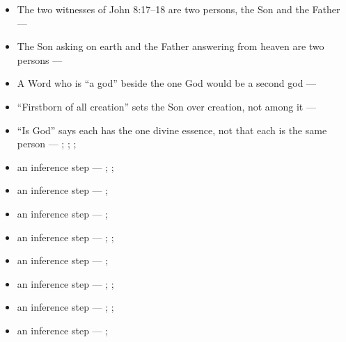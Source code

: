 \documentclass[11pt,paper=\testimonypaper,DIV=13,parskip=false]{scrartcl}
\begin{document}
\begin{itemize}
\begin{itemize}
\item The two witnesses of John 8:17–18 are two persons, the Son and the Father --- \cite[Against Praxeas 22]{roberts-ante-nicene-fathers-3-1885}
\item The Son asking on earth and the Father answering from heaven are two persons --- \cite[Against Praxeas 23]{roberts-ante-nicene-fathers-3-1885}
\item A Word who is “a god” beside the one God would be a second god --- \cite[75]{metzger-jehovahs-witnesses-jesus-christ-1953}
\item “Firstborn of all creation” sets the Son over creation, not among it --- \cite[Against the Arians II.62–63]{schaff-nicene-post-nicene-fathers-2-4-1892}
\item “Is God” says each has the one divine essence, not that each is the same person --- \cite[Letter 214, §4]{schaff-nicene-post-nicene-fathers-2-8-1895}; \cite[Letter 236, §6]{schaff-nicene-post-nicene-fathers-2-8-1895}; \cite[The Creed of Nicaea]{schaff-nicene-post-nicene-fathers-2-14-1900}; \cite[Against Praxeas 25]{roberts-ante-nicene-fathers-3-1885}
\item an inference step --- \cite[3, The Triune God]{kibbey-living-systematic-theology-2026}; \cite[ch. 4, Conclusion]{bernard-oneness-of-god-1983}; \cite[17--19]{buzzard-caveat-lector-2001}
\item an inference step --- \cite[Tractates on John 121.5]{schaff-nicene-post-nicene-fathers-1-7}; \cite[71]{metzger-jehovahs-witnesses-jesus-christ-1953}
\item an inference step --- \cite[on Hebrews 1:8]{calvin-hebrews-1853}; \cite{new-world-translation-2013}
\item an inference step --- \cite[23--24]{sharp-remarks-definitive-article-1803}; \cite[79]{metzger-jehovahs-witnesses-jesus-christ-1953}; \cite{new-world-translation-2013}
\item an inference step --- \cite[on Romans 9:5]{calvin-romans-1849}; \cite{new-world-translation-2013}
\item an inference step --- \cite[on Philippians 2:9–10]{calvin-commentaries-philippians}; \cite[on Romans 14:11]{calvin-romans-1849}; \cite{new-world-translation-2013}
\item an inference step --- \cite[75]{metzger-jehovahs-witnesses-jesus-christ-1953}; \cite[Origen, Against Celsus V.39]{roberts-ante-nicene-fathers-4-1885}; \cite[Justin, Dialogue with Trypho 56]{roberts-ante-nicene-fathers-1-1885}
\item an inference step --- \cite[Against the Arians II.62–63]{schaff-nicene-post-nicene-fathers-2-4-1892}; \cite[De Synodis 16]{schaff-nicene-post-nicene-fathers-2-4-1892}

\end{itemize}
\end{itemize}
\end{document}
